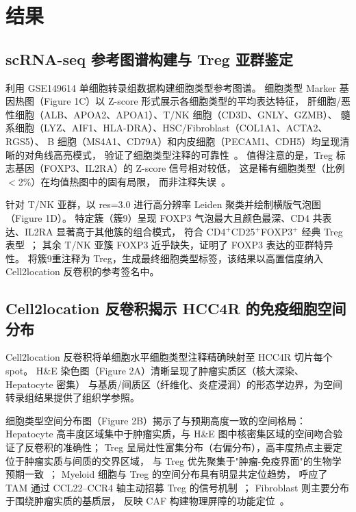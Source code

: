 \documentclass[12pt, a4paper]{ctexart}
\begin{document}

\section{结果}

\subsection{scRNA-seq 参考图谱构建与 Treg 亚群鉴定}

利用 GSE149614 单细胞转录组数据构建细胞类型参考图谱。
细胞类型 Marker 基因热图（Figure 1C）以 Z-score 形式展示各细胞类型的平均表达特征，
肝细胞/恶性细胞（ALB、APOA2、APOA1）、T/NK 细胞（CD3D、GNLY、GZMB）、
髓系细胞（LYZ、AIF1、HLA-DRA）、HSC/Fibroblast（COL1A1、ACTA2、RGS5）、
B 细胞（MS4A1、CD79A）和内皮细胞（PECAM1、CDH5）均呈现清晰的对角线高亮模式，
验证了细胞类型注释的可靠性~\citep{ma2021comprehensive}。
值得注意的是，Treg 标志基因（FOXP3、IL2RA）的 Z-score 信号相对较低，
这是稀有细胞类型（比例 $<$2\%）在均值热图中的固有局限，
而非注释失误~\citep{luecken2019current}。

针对 T/NK 亚群，以 res=3.0 进行高分辨率 Leiden 聚类并绘制横版气泡图（Figure 1D）。
特定簇（簇9）呈现 FOXP3 气泡最大且颜色最深、CD4 共表达、IL2RA 显著高于其他簇的组合模式，
符合 CD4$^+$CD25$^+$FOXP3$^+$ 经典 Treg 表型~\citep{sakaguchi2020regulatory}；
其余 T/NK 亚簇 FOXP3 近乎缺失，证明了 FOXP3 表达的亚群特异性。
将簇9重注释为 Treg，生成最终细胞类型标签，该结果以高置信度纳入 Cell2location 反卷积的参考签名中。

\subsection{Cell2location 反卷积揭示 HCC4R 的免疫细胞空间分布}

Cell2location 反卷积将单细胞水平细胞类型注释精确映射至 HCC4R 切片每个 spot。
H\&E 染色图（Figure 2A）清晰呈现了肿瘤实质区（核大深染、Hepatocyte 密集）
与基质/间质区（纤维化、炎症浸润）的形态学边界，为空间转录组结果提供了组织学参照。

细胞类型空间分布图（Figure 2B）揭示了与预期高度一致的空间格局：
Hepatocyte 高丰度区域集中于肿瘤实质，与 H\&E 图中核密集区域的空间吻合验证了反卷积的准确性；
Treg 呈局灶性富集分布（右偏分布），高丰度热点主要定位于肿瘤实质与间质的交界区域，
与 Treg 优先聚集于"肿瘤-免疫界面"的生物学预期一致~\citep{zheng2017landscape}；
Myeloid 细胞与 Treg 的空间分布具有明显共定位趋势，
呼应了 TAM 通过 CCL22--CCR4 轴主动招募 Treg 的信号机制~\citep{noy2014tumor}；
Fibroblast 则主要分布于围绕肿瘤实质的基质层，
反映 CAF 构建物理屏障的功能定位~\citep{kalluri2016biology}。
\end{document}
